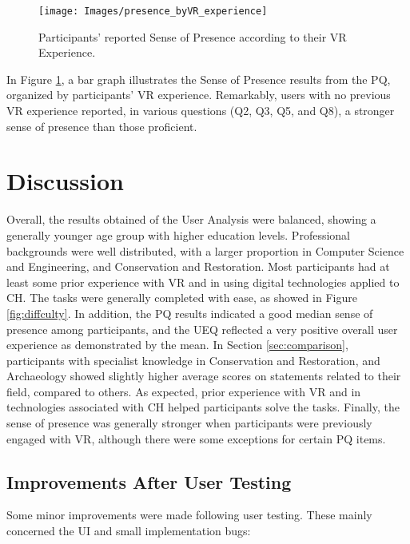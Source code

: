 \begin{figure}[h!]
    \centering
    \texttt{[image: Images/presence\_byVR\_experience]}
    \caption{Participants’ reported Sense of Presence according to their \gls{VR} Experience.} 
    \label{fig:presence_byVR_experience}
\end{figure}


In Figure \ref{fig:presence_byVR_experience}, a bar graph illustrates the Sense of Presence results from the \gls{PQ}, organized by participants’ \gls{VR} experience. 
Remarkably, users with no previous \gls{VR} experience reported, in various questions (Q2, Q3, Q5, and Q8), a stronger sense of presence than those proficient.

\FloatBarrier
\section{Discussion}
\label{sec:eval_discussion}

Overall, the results obtained of the User Analysis were balanced, showing a generally younger age group with higher education levels. Professional backgrounds were well distributed, with a larger proportion in Computer Science and Engineering, and Conservation and Restoration.
Most participants had at least some prior experience with \gls{VR} and in using digital technologies applied to \gls{CH}. The tasks were generally completed with ease, as showed in Figure \ref{fig:diffculty}. In addition, the \gls{PQ} results indicated a good median sense of presence among participants, and the \gls{UEQ} reflected a very positive overall user experience as demonstrated by the mean.
In Section \ref{sec:comparison}, participants with specialist knowledge in Conservation and Restoration, and Archaeology showed slightly higher average scores on statements related to their field, compared to others. As expected, prior experience with \gls{VR} and in technologies associated with \gls{CH} helped participants solve the tasks.
Finally, the sense of presence was generally stronger when participants were previously engaged with \gls{VR}, although there were some exceptions for certain \gls{PQ} items.

\subsection{Improvements After User Testing}
\label{sec:improvements}

Some minor improvements were made following user testing. These mainly concerned the \gls{UI} and small implementation bugs:

